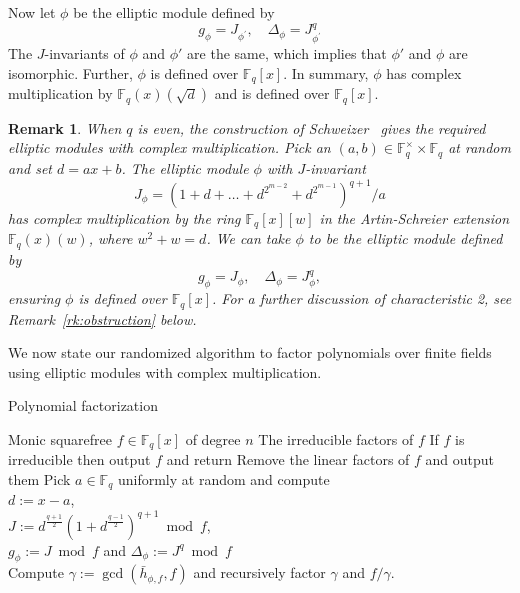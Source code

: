 \documentclass[12pt]{article}
\newtheorem{remark}{Remark}
\def\F{\ensuremath{\mathbb{F}}}
\newcommand{\D}{\Delta}
\begin{document}
Now let $\phi$ be the elliptic module defined by 
\[g_\phi = J_{\phi^\prime}, \quad  \D_\phi = J_{\phi^\prime}^{q} \]
The $J$-invariants of $\phi$ and $\phi'$ are the same, which implies that $\phi'$
and $\phi$ are isomorphic. Further, $\phi$ is defined over
$\F_q[x]$. In summary, $\phi$ has complex multiplication by
$\F_q(x)(\sqrt{d})$ and is defined over $\F_q[x]$.


\begin{remark}
When $q$ is even, the construction of Schweizer~\cite[Theorem
  6]{Schweizer97} gives the required elliptic modules with complex
multiplication. Pick an $(a,b)\in \F_q^\times \times \F_q$ at random
and set $d=ax+b$. The elliptic module $\phi$ with $J$-invariant
\[
J_{\phi} = \left(1+d+\ldots+d^{2^{m-2}}+d^{2^{m-1}}\right)^{q+1}/a
\]
has complex multiplication by the ring $\F_q[x][w]$ in the
Artin-Schreier extension $\F_q(x)(w)$, where $w^2+w=d$. We can take $\phi$ to
be the elliptic module defined by
\[g_\phi = J_{\phi}, \quad  \D_\phi = J_{\phi}^{q}, \]
ensuring $\phi$ is defined over $\F_q[x]$. For a further discussion
of characteristic 2, see Remark~\ref{rk:obstruction} below. 
\end{remark}

\noindent We now state our randomized algorithm to factor polynomials over
finite fields using elliptic modules with complex
multiplication. 

\begin{algorithm}[H]
  \caption{Polynomial factorization}
  \label{alg:factoring}
  \begin{algorithmic}[1]
    \REQUIRE Monic squarefree $f \in \F_q[x]$ of degree $n$
    \ENSURE The irreducible factors of $f$
    \STATE If $f$ is irreducible then output $f$ and return
    \STATE\label{step:fac-2}
    Remove the linear factors of $f$ and output them
    \STATE\label{step:fac-3}
    Pick $a \in \F_q$ uniformly at random and compute \\
    $d := x - a$,\\
    $J:=d^{\frac{q+1}{2}}\left(1+d^{\frac{q-1}{2}}\right)^{q+1} \bmod f$, \\
	$g_\phi:=J \bmod f$ and	$\Delta_\phi := J^q \bmod f$\\	
    \STATE\label{step:fac-split}
    Compute $\gamma := \gcd(\bar h_{\phi,f}, f)$ and recursively factor $\gamma$ and $f/\gamma$.
  \end{algorithmic}
\end{algorithm}
\end{document}

